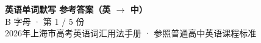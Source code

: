 \documentclass[10pt,a4paper]{article}
\begin{document}
\pagestyle{plain}

\begin{center}
{\LARGE\bfseries 英语单词默写 \quad 参考答案（英 $\to$ 中）}\\[0.22em]
{\large B 字母 · 第 1 / 5 份}\\[0.18em]
{\small 2026年上海市高考英语词汇用法手册 · 参照普通高中英语课程标准}
\end{center}

\vspace{0.2em}
\noindent{\color{rulegray}\rule{\textwidth}{0.8pt}}

\vspace{0.35em}

\vspace{0.25em}
\renewcommand{\arraystretch}{1.32}
\end{document}
